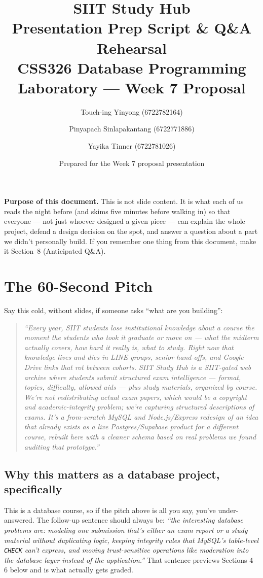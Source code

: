 \documentclass[11pt]{article}
\title{\color{accentc}\textbf{SIIT Study Hub}\\[0.2em]\Large Presentation Prep Script \& Q\&A Rehearsal\\[0.3em]\normalsize\color{mutedc} CSS326 Database Programming Laboratory --- Week 7 Proposal}
\author{Touch-ing Yinyong (6722782164) \and Pinyapach Sinlapakantang (6722771886) \and Yayika Tinner (6722781026)}
\date{Prepared for the Week 7 proposal presentation}
\begin{document}
\maketitle
\thispagestyle{fancy}

\noindent\textbf{Purpose of this document.} This is not slide content. It is what each of us reads the night before (and skims five minutes before walking in) so that everyone --- not just whoever designed a given piece --- can explain the whole project, defend a design decision on the spot, and answer a question about a part we didn't personally build. If you remember one thing from this document, make it Section~8 (Anticipated Q\&A).

\tableofcontents

\section{The 60-Second Pitch}

Say this cold, without slides, if someone asks ``what are you building'':

\begin{quote}
\itshape
``Every year, SIIT students lose institutional knowledge about a course the moment the students who took it graduate or move on --- what the midterm actually covers, how hard it really is, what to study. Right now that knowledge lives and dies in LINE groups, senior hand-offs, and Google Drive links that rot between cohorts. SIIT Study Hub is a SIIT-gated web archive where students submit \emph{structured} exam intelligence --- format, topics, difficulty, allowed aids --- plus study materials, organized by course. We're not redistributing actual exam papers, which would be a copyright and academic-integrity problem; we're capturing structured \emph{descriptions} of exams. It's a from-scratch MySQL and Node.js/Express redesign of an idea that already exists as a live Postgres/Supabase product for a different course, rebuilt here with a cleaner schema based on real problems we found auditing that prototype.''
\end{quote}

\subsection{Why this matters as a database project, specifically}
This is a database course, so if the pitch above is all you say, you've under-answered. The follow-up sentence should always be: \emph{``the interesting database problems are: modeling one submission that's either an exam report or a study material without duplicating logic, keeping integrity rules that MySQL's table-level \texttt{CHECK} can't express, and moving trust-sensitive operations like moderation into the database layer instead of the application.''} That sentence previews Sections 4--6 below and is what actually gets graded.
\end{document}
